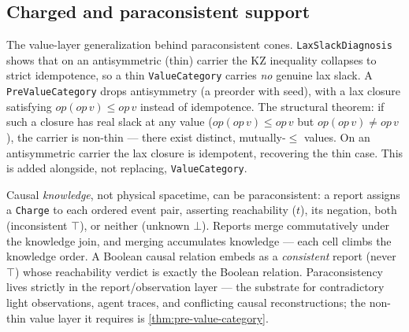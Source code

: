 \subsection{Charged and paraconsistent support}

\begin{theorem}\label{thm:pre-value-category}\leanok{}
The value-layer generalization behind paraconsistent cones. \texttt{LaxSlackDiagnosis} shows that on
an antisymmetric (thin) carrier the KZ inequality collapses to strict idempotence, so a thin
\texttt{ValueCategory} carries \emph{no} genuine lax slack. A \texttt{PreValueCategory} drops
antisymmetry (a preorder with seed), with a lax closure satisfying $op(op\,v)\le op\,v$ instead of
idempotence. The structural theorem: if such a closure has real slack at any value
($op(op\,v)\le op\,v$ but $op(op\,v)\neq op\,v$), the carrier is non-thin --- there exist distinct,
mutually-$\le$ values. On an antisymmetric carrier the lax closure is idempotent, recovering the
thin case. This is added alongside, not replacing, \texttt{ValueCategory}.
\end{theorem}

\begin{theorem}\label{thm:paraconsistent-cone}\leanok{}
Causal \emph{knowledge}, not physical spacetime, can be paraconsistent: a report assigns a
\texttt{Charge} to each ordered event pair, asserting reachability ($t$), its negation, both
(inconsistent $\top$), or neither (unknown $\bot$). Reports merge commutatively under the knowledge
join, and merging accumulates knowledge --- each cell climbs the knowledge order. A Boolean causal
relation embeds as a \emph{consistent} report (never $\top$) whose reachability verdict is exactly
the Boolean relation. Paraconsistency lives strictly in the report/observation layer --- the
substrate for contradictory light observations, agent traces, and conflicting causal
reconstructions; the non-thin value layer it requires is \cref{thm:pre-value-category}.
\end{theorem}

